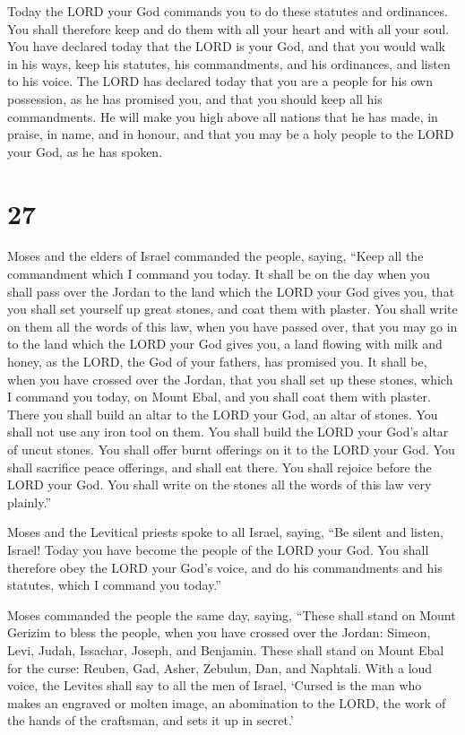  Today the LORD your God commands you to do these statutes
and ordinances. You shall therefore keep and do them with all your heart
and with all your soul.  You have declared today that the
LORD is your God, and that you would walk in his ways, keep his
statutes, his commandments, and his ordinances, and listen to his voice.
 The LORD has declared today that you are a people for his
own possession, as he has promised you, and that you should keep all his
commandments.  He will make you high above all nations that
he has made, in praise, in name, and in honour, and that you may be a
holy people to the LORD your God, as he has spoken.

\hypertarget{section-26}{%
\section{27}\label{section-26}}

 Moses and the elders of Israel commanded the people,
saying, ``Keep all the commandment which I command you today.
 It shall be on the day when you shall pass over the Jordan
to the land which the LORD your God gives you, that you shall set
yourself up great stones, and coat them with plaster.  You
shall write on them all the words of this law, when you have passed
over, that you may go in to the land which the LORD your God gives you,
a land flowing with milk and honey, as the LORD, the God of your
fathers, has promised you.  It shall be, when you have
crossed over the Jordan, that you shall set up these stones, which I
command you today, on Mount Ebal, and you shall coat them with plaster.
 There you shall build an altar to the LORD your God, an
altar of stones. You shall not use any iron tool on them. 
You shall build the LORD your God's altar of uncut stones. You shall
offer burnt offerings on it to the LORD your God.  You shall
sacrifice peace offerings, and shall eat there. You shall rejoice before
the LORD your God.  You shall write on the stones all the
words of this law very plainly.''

 Moses and the Levitical priests spoke to all Israel,
saying, ``Be silent and listen, Israel! Today you have become the people
of the LORD your God.  You shall therefore obey the LORD
your God's voice, and do his commandments and his statutes, which I
command you today.''

 Moses commanded the people the same day, saying,
 ``These shall stand on Mount Gerizim to bless the people,
when you have crossed over the Jordan: Simeon, Levi, Judah, Issachar,
Joseph, and Benjamin.  These shall stand on Mount Ebal for
the curse: Reuben, Gad, Asher, Zebulun, Dan, and Naphtali. 
With a loud voice, the Levites shall say to all the men of Israel,
 `Cursed is the man who makes an engraved or molten image,
an abomination to the LORD, the work of the hands of the craftsman, and
sets it up in secret.'

